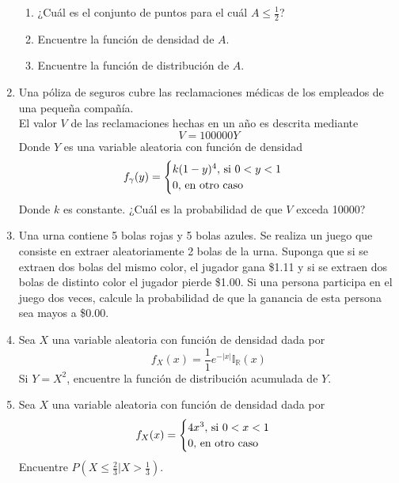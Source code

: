 \documentclass[12pt,a4paper]{report}
\begin{document}
\begin{enumerate}
{\begin{enumerate}
{				}
				\item {
					¿Cuál es el conjunto de puntos para el cuál $A \leq \frac{1}{2}$?
				}
				\item {
					Encuentre la función de densidad de $A$.
				}
				\item {
					Encuentre la función de distribución de $A$.
				}
			\end{enumerate}
		}
		\item {
			Una póliza de seguros cubre las reclamaciones médicas de los empleados
			de una pequeña compañía.\\
			El valor $V$ de las reclamaciones hechas en un año es descrita mediante
			\[V = 100000Y\]
			Donde $Y$ es una variable aleatoria con función de densidad
			\[
				f_\gamma(y) = \begin{cases}
												k(1-y)^4, $ si $ 0 < y < 1\\
												0, $ en otro caso$
											\end{cases}
			\]
			Donde $k$ es constante. ¿Cuál es la probabilidad de que $V$ exceda 10000?
			}
		\item {
			Una urna contiene 5 bolas rojas y 5 bolas azules. Se realiza un juego
			que consiste en extraer aleatoriamente 2 bolas de la urna. Suponga que
			si se extraen dos bolas del mismo color, el jugador gana \$1.11 y si se
			extraen dos bolas de distinto color el jugador pierde \$1.00. Si una
			persona participa en el juego dos veces, calcule la probabilidad de que
			la ganancia de esta persona sea mayos a \$0.00.
		}
		\item {
			Sea $X$ una variable aleatoria con función de densidad dada por
			\[f_X(x) = \frac{1}{1}e^{-|x|}\mathbb{I}_{\mathbb{R}}(x)\]
			Si $Y = X^2$, encuentre la función de distribución acumulada de $Y$.
		}
		\item {
			Sea $X$ una variable aleatoria con función de densidad dada por
			\[
				f_X(x) = \begin{cases}
									4x^3, $ si $ 0 < x < 1\\
									0, $ en otro caso$
								 \end{cases}
			\]
			Encuentre $P(X \leq \frac{2}{3}|X > \frac{1}{3})$.
		}
	\end{enumerate}
\end{document}
